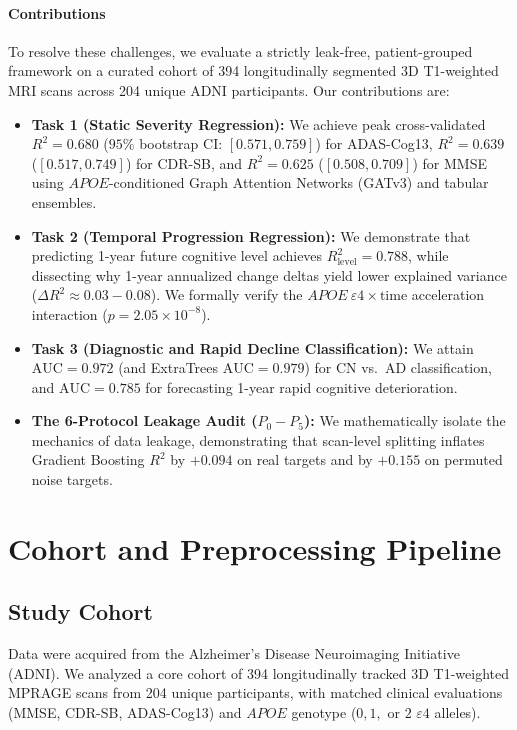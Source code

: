 \documentclass[journal,twocolumn]{IEEEtran}
\newcommand{\APOE}{\textit{APOE}}
\begin{document}
\paragraph{Contributions} To resolve these challenges, we evaluate a strictly leak-free, patient-grouped framework on a curated cohort of 394 longitudinally segmented 3D T1-weighted MRI scans across 204 unique ADNI participants. Our contributions are:
\begin{itemize}
    \item \textbf{Task 1 (Static Severity Regression):} We achieve peak cross-validated $R^2 = 0.680$ ($95\%$ bootstrap CI: $[0.571, 0.759]$) for ADAS-Cog13, $R^2 = 0.639$ ($[0.517, 0.749]$) for CDR-SB, and $R^2 = 0.625$ ($[0.508, 0.709]$) for MMSE using $\APOE$-conditioned Graph Attention Networks (GATv3) and tabular ensembles.
    \item \textbf{Task 2 (Temporal Progression Regression):} We demonstrate that predicting 1-year future cognitive level achieves $R^2_{\text{level}} = 0.788$, while dissecting why 1-year annualized change deltas yield lower explained variance ($\Delta R^2 \approx 0.03 - 0.08$). We formally verify the $\APOE\ \varepsilon4 \times \text{time}$ acceleration interaction ($p = 2.05 \times 10^{-8}$).
    \item \textbf{Task 3 (Diagnostic and Rapid Decline Classification):} We attain $\text{AUC} = 0.972$ (and ExtraTrees $\text{AUC} = 0.979$) for CN vs.\ AD classification, and $\text{AUC} = 0.785$ for forecasting 1-year rapid cognitive deterioration.
    \item \textbf{The 6-Protocol Leakage Audit ($P_0 - P_5$):} We mathematically isolate the mechanics of data leakage, demonstrating that scan-level splitting inflates Gradient Boosting $R^2$ by $+0.094$ on real targets and by $+0.155$ on permuted noise targets.
\end{itemize}

\section{Cohort and Preprocessing Pipeline}
\label{sec:cohort}

\subsection{Study Cohort}
Data were acquired from the Alzheimer's Disease Neuroimaging Initiative (ADNI). We analyzed a core cohort of 394 longitudinally tracked 3D T1-weighted MPRAGE scans from 204 unique participants, with matched clinical evaluations (MMSE, CDR-SB, ADAS-Cog13) and $\APOE$ genotype ($0, 1,$ or $2$ $\varepsilon4$ alleles).
\end{document}
